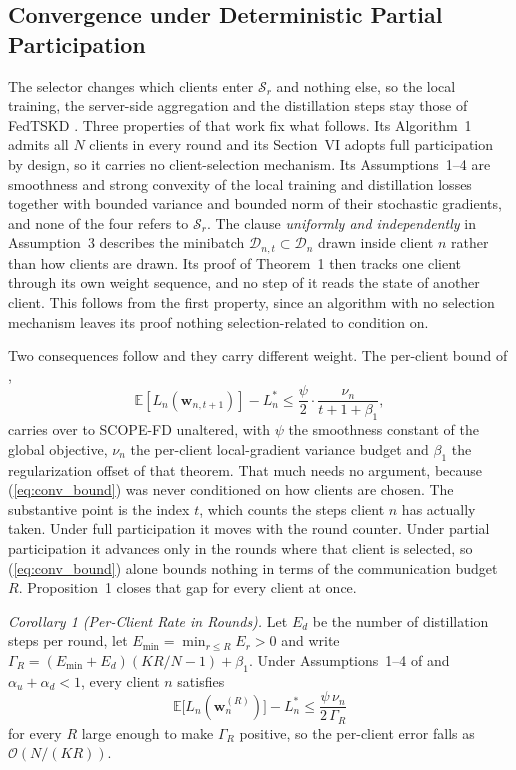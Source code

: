 \documentclass[journal]{IEEEtran}
\newcommand{\rev}[1]{#1}
\begin{document}
\subsection{\rev{Convergence under Deterministic Partial Participation}}
\label{ssec:convergence-compat}

\rev{The selector changes which clients enter $\mathcal{S}_r$ and nothing else, so the local training, the server-side aggregation and the distillation steps stay those of FedTSKD \cite{mu2024fedtskd}. Three properties of that work fix what follows. Its Algorithm~1 admits all $N$ clients in every round and its Section~VI adopts full participation by design, so it carries no client-selection mechanism. Its Assumptions~1--4 are smoothness and strong convexity of the local training and distillation losses together with bounded variance and bounded norm of their stochastic gradients, and none of the four refers to $\mathcal{S}_r$. The clause \emph{uniformly and independently} in Assumption~3 describes the minibatch $\mathcal{D}_{n,t} \subset \mathcal{D}_n$ drawn inside client $n$ rather than how clients are drawn. Its proof of Theorem~1 then tracks one client through its own weight sequence, and no step of it reads the state of another client. This follows from the first property, since an algorithm with no selection mechanism leaves its proof nothing selection-related to condition on.}

\rev{Two consequences follow and they carry different weight. The per-client bound of \cite[Theorem~1]{mu2024fedtskd},}
\begin{equation}
\mathbb{E}\!\left[L_n\!\left(\bm{w}_{n,t+1}\right)\right] - L_n^{*} \le \frac{\psi}{2}\cdot\frac{\nu_n}{t+1+\beta_1},
\label{eq:conv_bound}
\end{equation}
\rev{carries over to SCOPE-FD unaltered, with $\psi$ the smoothness constant of the global objective, $\nu_n$ the per-client local-gradient variance budget and $\beta_1$ the regularization offset of that theorem. That much needs no argument, because (\ref{eq:conv_bound}) was never conditioned on how clients are chosen. The substantive point is the index $t$, which counts the steps client $n$ has actually taken. Under full participation it moves with the round counter. Under partial participation it advances only in the rounds where that client is selected, so (\ref{eq:conv_bound}) alone bounds nothing in terms of the communication budget $R$. Proposition~1 closes that gap for every client at once.}

\rev{\textit{Corollary 1 (Per-Client Rate in Rounds).} Let $E_d$ be the number of distillation steps per round, let $E_{\min} = \min_{r \le R} E_r > 0$ and write $\Gamma_R = (E_{\min}+E_d)\left(KR/N - 1\right) + \beta_1$. Under Assumptions~1--4 of \cite{mu2024fedtskd} and $\alpha_u + \alpha_d < 1$, every client $n$ satisfies}
\begin{equation}
\mathbb{E}\bigl[L_n(\bm{w}_n^{(R)})\bigr] - L_n^{*} \le \frac{\psi\, \nu_n}{2\,\Gamma_R}
\label{eq:cor_perclient}
\end{equation}
\rev{for every $R$ large enough to make $\Gamma_R$ positive, so the per-client error falls as $\mathcal{O}(N/(KR))$.}
\end{document}
